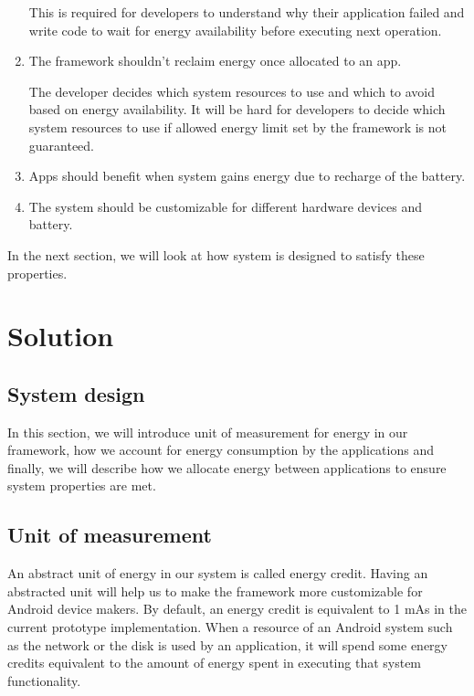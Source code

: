 \begin{enumerate}
This is required for developers to understand why their application failed and write code to wait for energy availability before executing next operation.

\item The framework shouldn't reclaim energy once allocated to an app.  

The developer decides which system resources to use and which to avoid based on energy availability.  It will be hard for developers to decide which system resources to use if allowed energy limit set by the framework is not guaranteed.

\item Apps should benefit when system gains energy due to recharge of the battery.
\item The system should be customizable for different hardware devices and battery.

\end{enumerate}


In the next section, we will look at how system is designed to satisfy these properties.


\section{Solution}
\label{solution}


\subsection{System design}


In this section, we will introduce unit of measurement for energy in our framework, how we account for energy consumption by the applications and finally, we will describe how we allocate energy between applications to ensure system properties are met.

\subsection{Unit of measurement}

An abstract unit of energy in our system is called energy credit. Having an abstracted unit will help us to make the framework more customizable for Android device makers. By default, an energy credit is equivalent to 1 mAs in the current prototype implementation. When a resource of an Android system such as the network or the disk is used by an application, it will spend some energy credits equivalent to the amount of energy spent in executing that system functionality.

